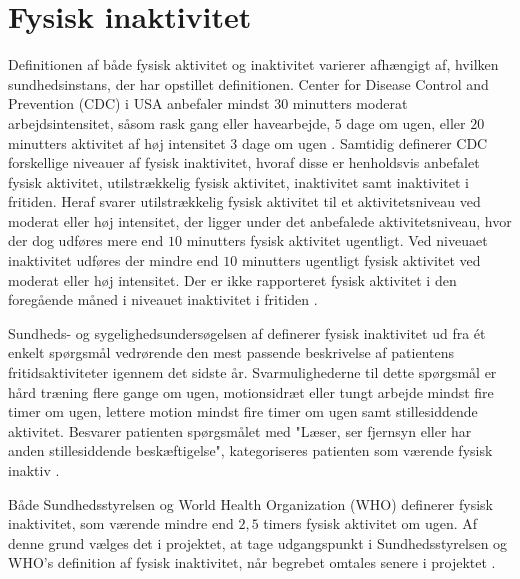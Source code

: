 \section{Fysisk inaktivitet}

Definitionen af både fysisk aktivitet og inaktivitet varierer afhængigt af, hvilken sundhedsinstans, der har opstillet definitionen. Center for Disease Control and Prevention (CDC) i USA anbefaler mindst $30$ minutters moderat arbejdsintensitet, såsom rask gang eller havearbejde, $5$ dage om ugen, eller $20$ minutters aktivitet af høj intensitet $3$ dage om ugen \citep{motionsraad2007,christensen2012}.
Samtidig definerer CDC forskellige niveauer af fysisk inaktivitet, hvoraf disse er henholdsvis anbefalet fysisk aktivitet, utilstrækkelig fysisk aktivitet, inaktivitet samt inaktivitet i fritiden. Heraf svarer utilstrækkelig fysisk aktivitet til et aktivitetsniveau ved moderat eller høj intensitet, der ligger under det anbefalede aktivitetsniveau, hvor der dog udføres mere end $10$ minutters fysisk aktivitet ugentligt. Ved niveuaet inaktivitet udføres der mindre end $10$ minutters ugentligt fysisk aktivitet ved moderat eller høj intensitet. Der er ikke rapporteret fysisk aktivitet i den foregående måned i niveauet inaktivitet i fritiden \citep{motionsraad2007,christensen2012}.

Sundheds- og sygelighedsundersøgelsen af \citeauthor{christensen2012} definerer fysisk inaktivitet ud fra ét enkelt spørgsmål vedrørende den mest passende beskrivelse af patientens fritidsaktiviteter igennem det sidste år. Svarmulighederne til dette spørgsmål er hård træning flere gange om ugen, motionsidræt eller tungt arbejde mindst fire timer om ugen, lettere motion mindst fire timer om ugen samt stillesiddende aktivitet. Besvarer patienten spørgsmålet med "Læser, ser fjernsyn eller har anden stillesiddende beskæftigelse", kategoriseres patienten som værende fysisk inaktiv \citep{motionsraad2007,christensen2012}.

Både Sundhedsstyrelsen og World Health Organization (WHO) definerer fysisk inaktivitet, som værende mindre end $2,5$ timers fysisk aktivitet om ugen. Af denne grund vælges det i projektet, at tage udgangspunkt i Sundhedsstyrelsen og WHO's definition af fysisk inaktivitet, når begrebet omtales senere i projektet \citep{motionsraad2007}.